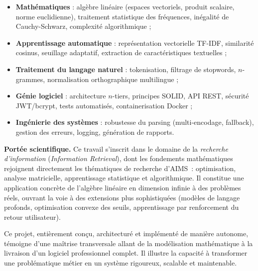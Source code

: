 \documentclass[12pt, a4paper]{article}
\begin{document}
\begin{itemize}
  \item \textbf{Mathématiques} : algèbre linéaire (espaces vectoriels, produit scalaire, norme euclidienne), traitement statistique des fréquences, inégalité de Cauchy-Schwarz, complexité algorithmique ;
  \item \textbf{Apprentissage automatique} : représentation vectorielle TF-IDF, similarité cosinus, seuillage adaptatif, extraction de caractéristiques textuelles ;
  \item \textbf{Traitement du langage naturel} : tokenisation, filtrage de stopwords, $n$-grammes, normalisation orthographique multilingue ;
  \item \textbf{Génie logiciel} : architecture $n$-tiers, principes SOLID, API REST, sécurité JWT/bcrypt, tests automatisés, containerisation Docker ;
  \item \textbf{Ingénierie des systèmes} : robustesse du parsing (multi-encodage, fallback), gestion des erreurs, logging, génération de rapports.
\end{itemize}

\begin{tcolorbox}[
  enhanced, arc=6pt,
  colback=lightblue, colframe=AIMSblue,
  boxrule=1pt, left=10pt, right=10pt, top=8pt, bottom=8pt
]
\textbf{Portée scientifique.} Ce travail s'inscrit dans le domaine de la \textit{recherche d'information} (\textit{Information Retrieval}), dont les fondements mathématiques rejoignent directement les thématiques de recherche d'AIMS~: optimisation, analyse matricielle, apprentissage statistique et algorithmique. Il constitue une application concrète de l'algèbre linéaire en dimension infinie à des problèmes réels, ouvrant la voie à des extensions plus sophistiquées (modèles de langage profonds, optimisation convexe des seuils, apprentissage par renforcement du retour utilisateur).
\end{tcolorbox}

\vspace{0.5cm}
Ce projet, entièrement conçu, architecturé et implémenté de manière autonome, témoigne d'une maîtrise transversale allant de la modélisation mathématique à la livraison d'un logiciel professionnel complet. Il illustre la capacité à transformer une problématique métier en un système rigoureux, scalable et maintenable.
\end{document}
